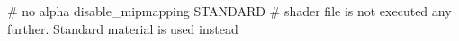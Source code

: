 # no alpha
disable_mipmapping
STANDARD     # shader file is not executed any further. Standard material is used instead


